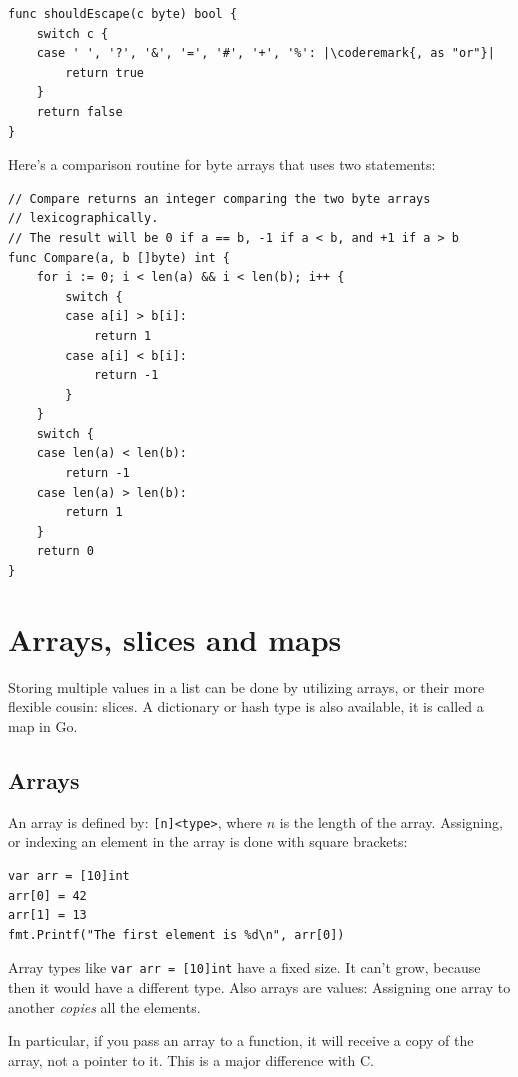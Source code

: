 \begin{lstlisting}
func shouldEscape(c byte) bool {
    switch c {
    case ' ', '?', '&', '=', '#', '+', '%': |\coderemark{, as "or"}|
        return true
    }
    return false
}
\end{lstlisting}
Here's a comparison routine for byte arrays that uses two  statements:

\begin{lstlisting}
// Compare returns an integer comparing the two byte arrays
// lexicographically.
// The result will be 0 if a == b, -1 if a < b, and +1 if a > b
func Compare(a, b []byte) int {
    for i := 0; i < len(a) && i < len(b); i++ {
        switch {
        case a[i] > b[i]:
            return 1
        case a[i] < b[i]:
            return -1
        }
    }
    switch {
    case len(a) < len(b):
        return -1
    case len(a) > len(b):
        return 1
    }
    return 0
}
\end{lstlisting}

\section{Arrays, slices and maps}
\label{sec:arrays}
Storing multiple values in a list can be done by utilizing arrays, or
their more flexible cousin: slices. A dictionary or hash type is also
available, it is called a map in Go.

\subsection{Arrays}
An array is defined by: \verb|[n]<type>|, where $n$ is the length
of the array.
Assigning, or indexing an element in the array is done with square
brackets:
\begin{lstlisting}
var arr = [10]int
arr[0] = 42
arr[1] = 13
fmt.Printf("The first element is %d\n", arr[0])
\end{lstlisting}
Array types like \lstinline{var arr = [10]int} have a fixed size.
It can't grow, because then it would have a different type. Also arrays
are values: Assigning one array to another \emph{copies} all the elements.

In particular, if you pass an array to a function, it will receive a
copy of the array, not a pointer to it. This is a major difference with C.

